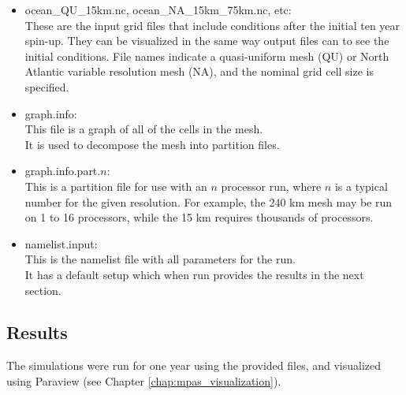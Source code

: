 \begin{itemize}
	\item ocean\_QU\_15km.nc, ocean\_NA\_15km\_75km.nc, etc: \\
		These are the input grid files that include conditions after the initial ten year spin-up. They can be visualized in the same way output files can to see the initial conditions. File names indicate a quasi-uniform mesh (QU) or North Atlantic variable resolution mesh (NA), and the nominal grid cell size is specified.
	\item graph.info: \\
		This file is a graph of all of the cells in the mesh. \\
		It is used to decompose the mesh into partition files.
	\item graph.info.part.$n$: \\
		This is a partition file for use with an $n$ processor run, where $n$ is a typical number for the given resolution.  For example, the 240 km mesh may be run on 1 to 16 processors, while the 15 km requires thousands of processors.
	\item namelist.input: \\
		This is the namelist file with all parameters for the run. \\
		It has a default setup which when run provides the results in the next section.
\end{itemize}

\subsection{Results}
\label{subsecc:realWorld_results}

The simulations were run for one year using the provided files, and visualized using Paraview (see Chapter \ref{chap:mpas_visualization}).

